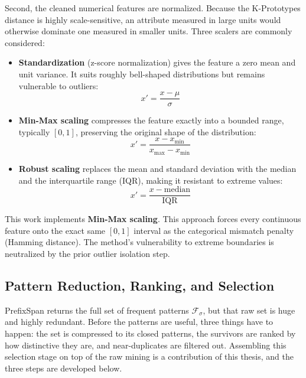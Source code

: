 Second, the cleaned numerical features are normalized. Because the K-Prototypes distance is highly scale-sensitive, an attribute measured in large units would otherwise dominate one measured in smaller units. Three scalers are commonly considered:

\begin{itemize}
    \item \textbf{Standardization} (z-score normalization) gives the feature a zero mean and unit variance. It suits roughly bell-shaped distributions but remains vulnerable to outliers:
    \begin{equation}
        x' = \frac{x - \mu}{\sigma}
        \label{eq:standardization}
    \end{equation}

    \item \textbf{Min-Max scaling} compresses the feature exactly into a bounded range, typically $[0,1]$, preserving the original shape of the distribution:
    \begin{equation}
        x' = \frac{x - x_{\min}}{x_{\max} - x_{\min}}
        \label{eq:minmax}
    \end{equation}

    \item \textbf{Robust scaling} replaces the mean and standard deviation with the median and the interquartile range (IQR), making it resistant to extreme values:
    \begin{equation}
        x' = \frac{x - \text{median}}{\text{IQR}}
        \label{eq:robust}
    \end{equation}
\end{itemize}

This work implements \textbf{Min-Max scaling}. This approach forces every continuous feature onto the exact same $[0,1]$ interval as the categorical mismatch penalty (Hamming distance). The method's vulnerability to extreme boundaries is neutralized by the prior outlier isolation step.

\subsection{Pattern Reduction, Ranking, and Selection}

PrefixSpan returns the full set of frequent patterns $\mathcal{F}_\sigma$, but that raw set is huge and highly redundant. Before the patterns are useful, three things have to happen: the set is compressed to its closed patterns, the survivors are ranked by how distinctive they are, and near-duplicates are filtered out. Assembling this selection stage on top of the raw mining is a contribution of this thesis, and the three steps are developed below.

